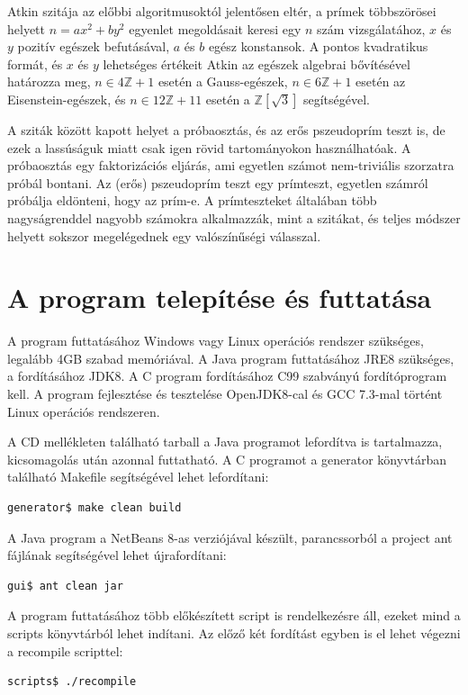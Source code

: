 Atkin szitája\cite{atkin} az előbbi algoritmusoktól jelentősen eltér, a prímek többszörösei
helyett $n=ax^2+by^2$ egyenlet megoldásait keresi egy $n$ szám vizsgálatához, $x$ és $y$ pozitív egészek befutásával, $a$ és $b$ egész konstansok.
A pontos kvadratikus formát, és $x$ és $y$ lehetséges értékeit Atkin az egészek algebrai bővítésével határozza meg, $n \in 4\mathbb{Z}+1$ esetén a Gauss-egészek, $n \in 6\mathbb{Z}+1$ esetén az Eisenstein-egészek, és $n \in 12\mathbb{Z}+11$ esetén a $\mathbb{Z}[\sqrt{3}]$ segítségével.

A sziták között kapott helyet a próbaosztás, és az erős pszeudoprím teszt\cite{pseudoprime} is, de ezek a lassúságuk miatt csak igen rövid tartományokon használhatóak.
A próbaosztás egy faktorizációs eljárás, ami egyetlen számot nem-triviális szorzatra próbál bontani.
Az (erős) pszeudoprím teszt egy prímteszt, egyetlen számról próbálja eldönteni, hogy az prím-e.
A prímteszteket általában több nagyságrenddel nagyobb számokra alkalmazzák, mint a szitákat, és teljes módszer helyett sokszor megelégednek egy valószínűségi válasszal.

\section{A program telepítése és futtatása}

A program futtatásához Windows vagy Linux operációs rendszer szükséges,
legalább 4GB szabad memóriával.
A Java program futtatásához JRE8 szükséges, a fordításához JDK8.
A C program fordításához C99 szabványú fordítóprogram kell.  A program fejlesztése és tesztelése OpenJDK8-cal és GCC 7.3-mal történt
Linux operációs rendszeren.

A CD mellékleten található tarball a Java programot lefordítva is tartalmazza,
kicsomagolás után azonnal futtatható.
A C programot a generator könyvtárban található Makefile segítségével lehet lefordítani:
\begin{lstlisting}[language=bash]
generator$ make clean build
\end{lstlisting}

A Java program a NetBeans 8-as verziójával készült,
parancssorból a project ant fájlának segítségével lehet
újrafordítani:
\begin{lstlisting}[language=bash]
gui$ ant clean jar
\end{lstlisting}

A program futtatásához több előkészített script is rendelkezésre áll,
ezeket mind a scripts könyvtárból lehet indítani.
Az előző két fordítást egyben is el lehet végezni a recompile scripttel:
\begin{lstlisting}[language=bash]
scripts$ ./recompile
\end{lstlisting}

